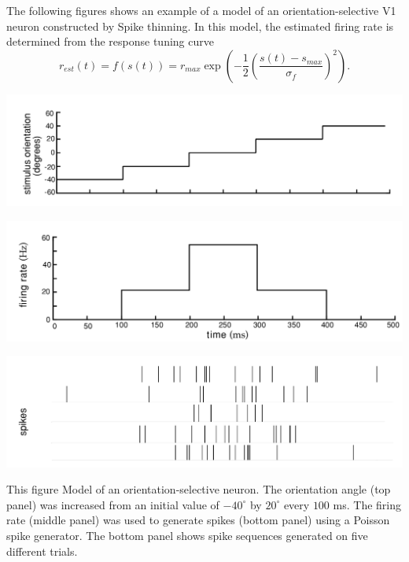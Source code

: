 \begin{exm}
    The following figures shows an example of a model of an orientation-selective V1 neuron constructed by  Spike thinning. In this model,  the estimated firing rate is determined from the response tuning curve
    \begin{equation}
        r_{est}(t)=f(s(t))=r_{max}\exp\left(-\frac{1}{2}\left(\frac{s(t)-s_{max}}{\sigma_f}\right)^2\right).
        \label{equ:1.38}
    \end{equation}
\end{exm}

\begin{center}
    \label{fig:1.13A}    
    \includegraphics[scale = 0.2]{png/Figure1-13-A.png}\\
\end{center}

\begin{center}
    \label{fig:1.13B}    
    \includegraphics[scale = 0.2]{png/Figure1-13-B.png}\\
\end{center}

\begin{center}
    \label{fig:1.13C}    
    \includegraphics[scale = 0.2]{png/Figure1-13-C.png}\\
\end{center}
This figure Model of an orientation-selective neuron. The orientation angle (top
panel) was increased from an initial value of $-40^\circ$  by $20^\circ $  every $100$ ms. The firing
rate (middle panel) was used to generate spikes (bottom panel) using a Poisson
spike generator. The bottom panel shows spike sequences generated on five different trials.

